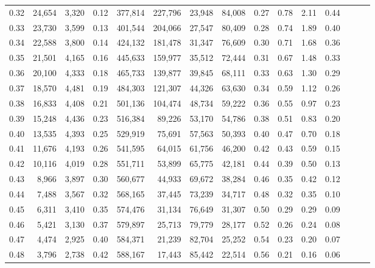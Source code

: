 \begin{tabular}{rrrrrrrrrrrrrrr}
0.32 &  24,654 &  3,320 &  0.12 &  377,814 &  227,796 &   23,948 &   84,008 &  0.27 &  0.78 &  2.11 &      0.44 \\
0.33 &  23,730 &  3,599 &  0.13 &  401,544 &  204,066 &   27,547 &   80,409 &  0.28 &  0.74 &  1.89 &      0.40 \\
0.34 &  22,588 &  3,800 &  0.14 &  424,132 &  181,478 &   31,347 &   76,609 &  0.30 &  0.71 &  1.68 &      0.36 \\
0.35 &  21,501 &  4,165 &  0.16 &  445,633 &  159,977 &   35,512 &   72,444 &  0.31 &  0.67 &  1.48 &      0.33 \\
0.36 &  20,100 &  4,333 &  0.18 &  465,733 &  139,877 &   39,845 &   68,111 &  0.33 &  0.63 &  1.30 &      0.29 \\
0.37 &  18,570 &  4,481 &  0.19 &  484,303 &  121,307 &   44,326 &   63,630 &  0.34 &  0.59 &  1.12 &      0.26 \\
0.38 &  16,833 &  4,408 &  0.21 &  501,136 &  104,474 &   48,734 &   59,222 &  0.36 &  0.55 &  0.97 &      0.23 \\
0.39 &  15,248 &  4,436 &  0.23 &  516,384 &   89,226 &   53,170 &   54,786 &  0.38 &  0.51 &  0.83 &      0.20 \\
0.40 &  13,535 &  4,393 &  0.25 &  529,919 &   75,691 &   57,563 &   50,393 &  0.40 &  0.47 &  0.70 &      0.18 \\
0.41 &  11,676 &  4,193 &  0.26 &  541,595 &   64,015 &   61,756 &   46,200 &  0.42 &  0.43 &  0.59 &      0.15 \\
0.42 &  10,116 &  4,019 &  0.28 &  551,711 &   53,899 &   65,775 &   42,181 &  0.44 &  0.39 &  0.50 &      0.13 \\
0.43 &   8,966 &  3,897 &  0.30 &  560,677 &   44,933 &   69,672 &   38,284 &  0.46 &  0.35 &  0.42 &      0.12 \\
0.44 &   7,488 &  3,567 &  0.32 &  568,165 &   37,445 &   73,239 &   34,717 &  0.48 &  0.32 &  0.35 &      0.10 \\
0.45 &   6,311 &  3,410 &  0.35 &  574,476 &   31,134 &   76,649 &   31,307 &  0.50 &  0.29 &  0.29 &      0.09 \\
0.46 &   5,421 &  3,130 &  0.37 &  579,897 &   25,713 &   79,779 &   28,177 &  0.52 &  0.26 &  0.24 &      0.08 \\
0.47 &   4,474 &  2,925 &  0.40 &  584,371 &   21,239 &   82,704 &   25,252 &  0.54 &  0.23 &  0.20 &      0.07 \\
0.48 &   3,796 &  2,738 &  0.42 &  588,167 &   17,443 &   85,442 &   22,514 &  0.56 &  0.21 &  0.16 &      0.06 \\

\end{tabular}
